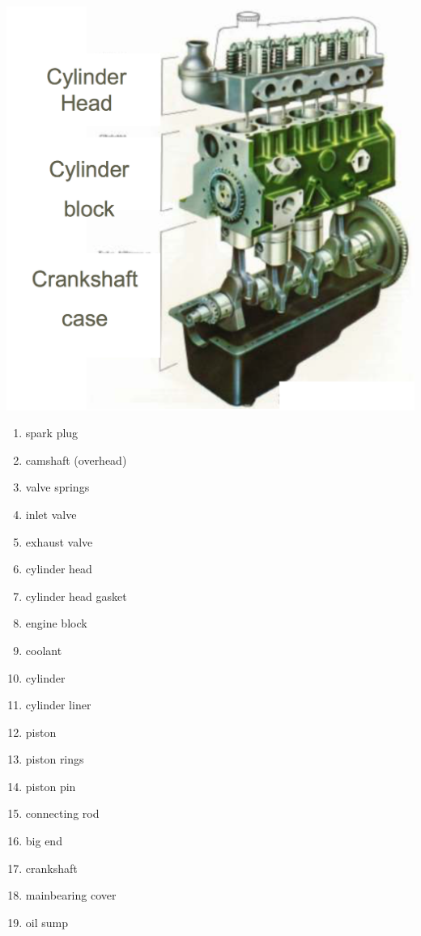 \begin{center}
			\begin{minipage}{0.4\textwidth}			
			\includegraphics[scale=0.3]{ch1/11}
			\end{minipage}
			\end{center}
			\begin{multicols}{4}
			\begin{enumerate}			
			\item	spark plug
			\item	camshaft (overhead)
			\item	valve springs
			\item	inlet valve	
			\item 	exhaust valve
			\item	cylinder head
			\item	cylinder head gasket
			\item	engine block
			\item	coolant
			\item	cylinder
			\item	cylinder liner
			\item	piston
			\item	piston rings	
			\item	piston pin	
			\item	connecting rod
			\item	big end
			\item 	crankshaft
			\item 	mainbearing cover
			\item	oil sump
			\end{enumerate}
			\end{multicols}
			

